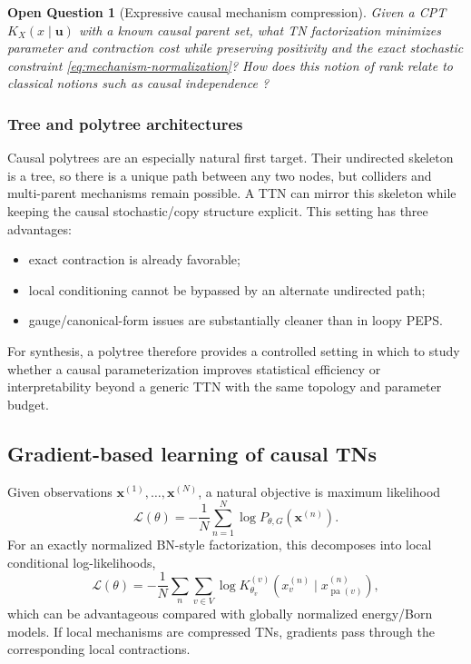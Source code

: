 \documentclass[11pt]{article}
\newtheorem{question}[definition]{Open Question}
\theoremstyle{remark}
\newcommand{\pa}{\operatorname{pa}}
\begin{document}
\begin{question}[Expressive causal mechanism compression]
Given a CPT $K_X(x\mid\bm u)$ with a known causal parent set, what TN factorization minimizes parameter and contraction cost while preserving positivity and the exact stochastic constraint \eqref{eq:mechanism-normalization}? How does this notion of rank relate to classical notions such as causal independence \cite{heckerman1994causal}?
\end{question}

\subsubsection{Tree and polytree architectures}

Causal polytrees are an especially natural first target. Their undirected skeleton is a tree, so there is a unique path between any two nodes, but colliders and multi-parent mechanisms remain possible. A TTN can mirror this skeleton while keeping the causal stochastic/copy structure explicit. This setting has three advantages:
\begin{itemize}
\item exact contraction is already favorable;
\item local conditioning cannot be bypassed by an alternate undirected path;
\item gauge/canonical-form issues are substantially cleaner than in loopy PEPS.
\end{itemize}
For synthesis, a polytree therefore provides a controlled setting in which to study whether a causal parameterization improves statistical efficiency or interpretability beyond a generic TTN with the same topology and parameter budget.

\subsection{Gradient-based learning of causal TNs}
\label{sec:synthesis-learning}

Given observations $\bm x^{(1)},\ldots,\bm x^{(N)}$, a natural objective is maximum likelihood
\begin{equation}
\mathcal L(\theta)=-\frac1N\sum_{n=1}^N\log P_{\theta,G}(\bm x^{(n)}).
\end{equation}
For an exactly normalized BN-style factorization, this decomposes into local conditional log-likelihoods,
\begin{equation}
\mathcal L(\theta)= -\frac1N\sum_n\sum_{v\in V}
\log K^{(v)}_{\theta_v}(x_v^{(n)}\mid x_{\pa(v)}^{(n)}),
\end{equation}
which can be advantageous compared with globally normalized energy/Born models. If local mechanisms are compressed TNs, gradients pass through the corresponding local contractions.
\end{document}
